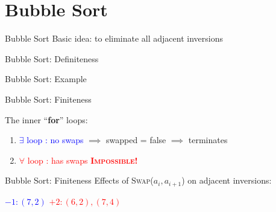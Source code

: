\section{Bubble Sort}

\begin{frame}{Bubble Sort}
  Basic idea: to eliminate all adjacent inversions

  
\end{frame}
\begin{frame}{Bubble Sort: Definiteness}
  
\end{frame}
\begin{frame}{Bubble Sort: Example}
  \begin{center}
  \end{center}

  \begin{center}
	
  \end{center}

\end{frame}
\begin{frame}{Bubble Sort: Finiteness}
  \begin{center}
  \end{center}

  \pause

  The inner ``{\bf for}'' loops:
  \begin{enumerate}[1)]
	\item \textcolor{blue}{$\exists$ loop : no swaps} $\implies$ swapped = false $\implies$ terminates
	  \pause
	\item \textcolor{red}{$\forall$ loop : has swaps} \pause \qquad \textcolor{red}{\bf \textsc{Impossible}!}
  \end{enumerate}
\end{frame}
\begin{frame}{Bubble Sort: Finiteness}
  Effects of \textsc{Swap}{($a_{i}, a_{i+1}$)} on adjacent inversions:

  \pause
  \begin{center}
	\textcolor{blue}{$-1: (7,2)$} \pause \qquad\qquad \textcolor{red}{$+2: (6,2), (7,4)$}
  \end{center}
\end{frame}
